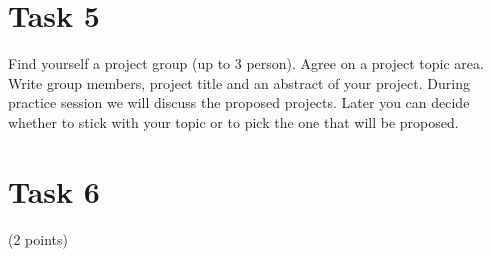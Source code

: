 \documentclass{article}
\begin{document}
\section*{Task 5}
Find yourself a project group (up to 3 person). Agree on a project topic area. Write group members, project title and an abstract of your project. During practice session we will discuss the proposed projects. Later you can decide whether to stick with your topic or to pick the one that will be proposed. 


\section*{Task 6}(2 points)
\end{document}
